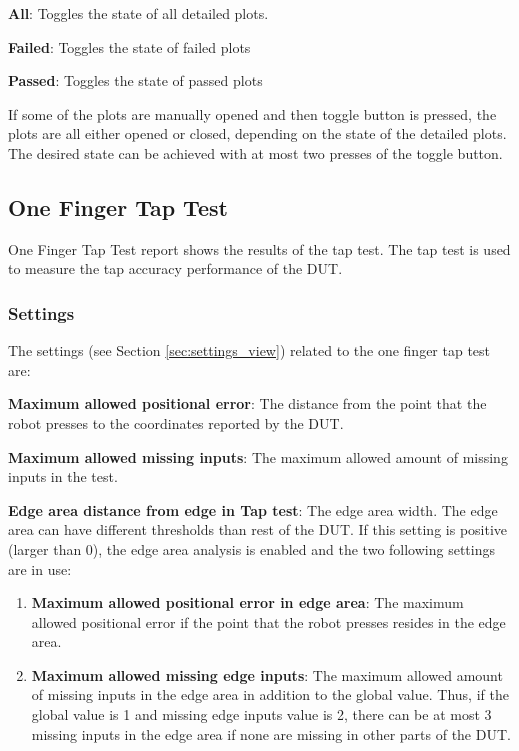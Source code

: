 \textbf{All}: Toggles the state of all detailed plots.

\textbf{Failed}: Toggles the state of failed plots

\textbf{Passed}: Toggles the state of passed plots

If some of the plots are manually opened and then toggle button is pressed, the plots are all either opened or closed, depending on the state of the detailed plots. The desired state can be achieved with at most two presses of the toggle button.

\subsection{\label{sec:one_finger_tap_test}One Finger Tap Test}

One Finger Tap Test report shows the results of the tap test. The tap test is used to measure the tap accuracy performance of the DUT.

\subsubsection{Settings}

The settings (see Section \ref{sec:settings_view}) related to the one finger tap test are:

\textbf{Maximum allowed positional error}: The distance from the point that the robot presses to the coordinates reported by the DUT.

\textbf{Maximum allowed missing inputs}: The maximum allowed amount of missing inputs in the test.

\textbf{Edge area distance from edge in Tap test}: The edge area width. The edge area can have different thresholds than rest of the DUT. If this setting is positive (larger than 0), the edge area analysis is enabled and the two following settings are in use:

\begin{enumerate}
\item \textbf{Maximum allowed positional error in edge area}: The maximum allowed positional error if the point that the robot presses resides in the edge area.
\item \textbf{Maximum allowed missing edge inputs}: The maximum allowed amount of missing inputs in the edge area in addition to the global value. Thus, if the global value is 1 and missing edge inputs value is 2, there can be at most 3 missing inputs in the edge area if none are missing in other parts of the DUT.
\end{enumerate}

